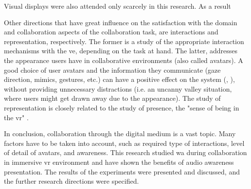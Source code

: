 Visual displays were also attended only scarcely in this research. As a result 

Other directions that have great influence on the satisfaction with the domain and collaboration aspects of the collaboration task, are interactions and representation, respectively. The former is a study of the appropriate interaction mechanisms with the \gls{ve}, depending on the task at hand. The latter, addresses the appearance users have in collaborative environments (also called avatars). A good choice of user avatars and the information they communicate (gaze direction, mimics, gestures, etc.) can have a positive effect on the system (\parencite{gutwin_cocoverse_nodate}, \parencite{lena_real-time_nodate}), without providing unnecessary distractions (i.e. an uncanny valley situation, where users might get drawn away due to the appearance). The study of representation is closely related to the study of presence, the "sense of being in the \gls{vr}" \parencite{schubert_experience_2001}.

In conclusion, collaboration through the digital medium is a vast topic. Many factors have to be taken into account, such as required type of interactions, level of detail of avatars, and awareness. This research studied \gls{wa} during collaboration in immersive \gls{vr} environment and have shown the benefits of audio awareness presentation. The results of the experiments were presented and discussed, and the further research directions were specified.
% 






